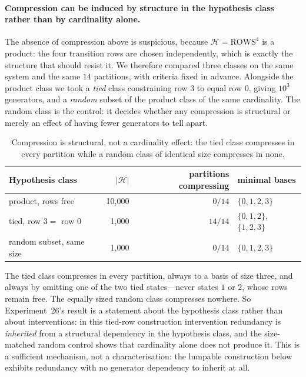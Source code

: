 \documentclass[11pt]{article}
\newcommand{\HH}{\ensuremath{\mathcal{H}}}
\begin{document}
\paragraph{Compression can be induced by structure in the hypothesis class rather than
by cardinality alone.}
The absence of compression above is suspicious, because $\HH = \mathrm{ROWS}^4$ is a
product: the four transition rows are chosen independently, which is exactly the structure
that should resist it. We therefore compared three classes on the same system and the same
$14$ partitions, with criteria fixed in advance. Alongside the product class we took a
\emph{tied} class constraining row $3$ to equal row $0$, giving $10^3$ generators, and a
\emph{random} subset of the product class of the same cardinality. The random class is the
control: it decides whether any compression is structural or merely an effect of having
fewer generators to tell apart.

\begin{table}[h]
\centering
\begin{tabular}{lrrl}
\toprule
Hypothesis class & $|\HH|$ & partitions compressing & minimal bases \\
\midrule
product, rows free            & 10{,}000 & $0/14$  & $\{0,1,2,3\}$ \\
tied, row $3 =$ row $0$       & 1{,}000  & $14/14$ & $\{0,1,2\}$, $\{1,2,3\}$ \\
random subset, same size      & 1{,}000  & $0/14$  & $\{0,1,2,3\}$ \\
\bottomrule
\end{tabular}
\caption{Compression is structural, not a cardinality effect: the tied class compresses in
every partition while a random class of identical size compresses in none.}
\label{tab:structure}
\end{table}

The tied class compresses in every partition, always to a basis of size three, and always
by omitting one of the two tied states---never states $1$ or $2$, whose rows remain free.
The equally sized random class compresses nowhere. So Experiment~26's result is a statement
about the hypothesis class rather than about interventions: in this tied-row construction
intervention redundancy is \emph{inherited} from a structural dependency in the hypothesis
class, and the size-matched random control shows that cardinality alone does not produce
it. This is a sufficient mechanism, not a characterisation: the lumpable construction below
exhibits redundancy with no generator dependency to inherit at all.
\end{document}
